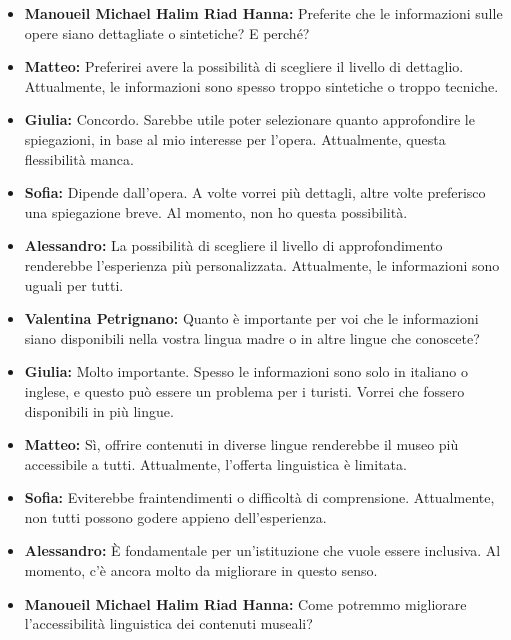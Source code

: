 \documentclass{article}
\begin{document}
\begin{itemize}
\item \textbf{Manoueil Michael Halim Riad Hanna:} Preferite che le informazioni sulle opere siano dettagliate o sintetiche? E perché?

\item \textbf{Matteo:} Preferirei avere la possibilità di scegliere il livello di dettaglio. Attualmente, le informazioni sono spesso troppo sintetiche o troppo tecniche.

\item \textbf{Giulia:} Concordo. Sarebbe utile poter selezionare quanto approfondire le spiegazioni, in base al mio interesse per l’opera. Attualmente, questa flessibilità manca.

\item \textbf{Sofia:} Dipende dall’opera. A volte vorrei più dettagli, altre volte preferisco una spiegazione breve. Al momento, non ho questa possibilità.

\item \textbf{Alessandro:} La possibilità di scegliere il livello di approfondimento renderebbe l’esperienza più personalizzata. Attualmente, le informazioni sono uguali per tutti.

\item \textbf{Valentina Petrignano:} Quanto è importante per voi che le informazioni siano disponibili nella vostra lingua madre o in altre lingue che conoscete?

\item \textbf{Giulia:} Molto importante. Spesso le informazioni sono solo in italiano o inglese, e questo può essere un problema per i turisti. Vorrei che fossero disponibili in più lingue.

\item \textbf{Matteo:} Sì, offrire contenuti in diverse lingue renderebbe il museo più accessibile a tutti. Attualmente, l’offerta linguistica è limitata.

\item \textbf{Sofia:} Eviterebbe fraintendimenti o difficoltà di comprensione. Attualmente, non tutti possono godere appieno dell’esperienza.

\item \textbf{Alessandro:} È fondamentale per un’istituzione che vuole essere inclusiva. Al momento, c’è ancora molto da migliorare in questo senso.

\item \textbf{Manoueil Michael Halim Riad Hanna:} Come potremmo migliorare l’accessibilità linguistica dei contenuti museali?


\end{itemize}
\end{document}
